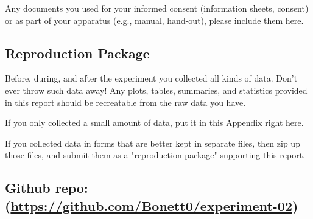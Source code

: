 \documentclass{article}
\begin{document}
Any documents you used for your informed consent (information sheets, consent) or as part of your apparatus (e.g., manual, hand-out), please include them here.

\subsection{Reproduction Package}

Before, during, and after the experiment you collected all kinds of data. Don't ever throw such data away! Any plots, tables, summaries, and statistics provided in this report should be recreatable from the raw data you have.

If you only collected a small amount of data, put it in this Appendix right here.

If you collected data in forms that are better kept in separate files, then zip up those files, and submit them as a "reproduction package" supporting this report.


\subsection*{{Github repo: (\url{https://github.com/Bonett0/experiment-02})}}
\end{document}
